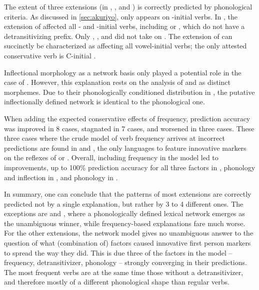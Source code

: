 The extent of three extensions (in \akuriyo, \carijo, and \yukpa) is correctly predicted by phonological criteria.
As discussed in \cref{sec:akuriyo}, \akuriyo {} only appears on -initial verbs.
In \carijo, the extension of  affected all - and -initial verbs, including   or  , which do not have a detransitivizing prefix.
Only  ,  , and   did not take on .
The extension of \yukpa {} can succinctly be characterized as affecting all vowel-initial verbs; the only attested conservative verb is C-initial  .

Inflectional morphology as a network basis only played a potential role in the case of \akuriyo.
However, this explanation rests on the analysis of  and  as distinct morphemes.
Due to their phonologically conditioned distribution in \PTir, the putative inflectionally defined network is identical to the phonological one.

When adding the expected conservative effects of frequency, prediction accuracy was improved in 8 cases, stagnated in 7 cases, and worsened in three cases.
These three cases where the crude model of verb frequency arrives at incorrect predictions are found in \carijo and \yukpa, the only languages to feature innovative markers on the reflexes of   or  .
Overall, including frequency in the model led to improvements, up to 100\% prediction accuracy for all three factors in \PTir, phonology and inflection in \PWai, and phonology in \PPek.

In summary, one can conclude that the patterns of most extensions are correctly predicted not by a single explanation, but rather by 3 to 4 different ones.
The exceptions are \carijo and \yukpa, where a phonologically defined lexical network emerges as the unambiguous winner, while frequency-based explanations fare much worse.
For the other extensions, the network model gives no unambiguous answer to the question of what (combination of) factors caused innovative first person markers to spread the way they did.
This is due three of the factors in the model -- frequency, detransitivizer, phonology -- strongly converging in their predictions.
The most frequent  verbs are at the same time those without a detransitivizer, and therefore mostly of a different phonological shape than regular  verbs.
